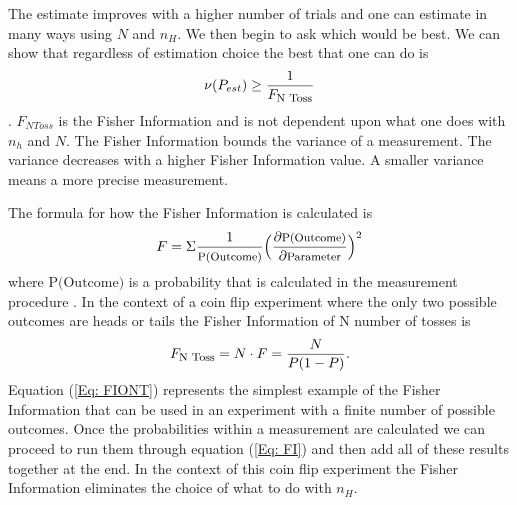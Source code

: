 \documentclass[twocolumn]{article}
\begin{document}
The estimate improves with a higher number of trials and one can estimate in many ways using $N$ and $n_H$. We then begin to ask which would be best. We can show that regardless of estimation choice the best that one can do is
\begin{equation} \label{Eq: VOPE}
\nu(P_{est})\geq\frac{1}{F_{\text{\footnotesize{N Toss}}}}
\end{equation}
\cite{D. Collins}. $F_{N Toss}$ is the Fisher Information and is not dependent upon what one does with $n_h$ and $N$. The Fisher Information bounds the variance of a measurement.  The variance decreases with a higher Fisher Information value. A smaller variance means a more precise measurement.

The formula for how the Fisher Information is calculated is 
\begin{equation} \label{Eq: FI}
F=\Sigma\frac{1}{\text{\footnotesize{P(Outcome)}}}\Big(\frac{\partial \text{\footnotesize{P(Outcome)}}}{\partial\text{\footnotesize{Parameter}}}\Big)^2
\end{equation}
where $\text{P(Outcome)}$ is a probability that is calculated in the measurement procedure \cite{Paris}. In the context of a coin flip experiment where the only two possible outcomes are heads or tails the Fisher Information of N number of tosses is
\begin{equation} \label{Eq: FIONT}
F_{\text{\footnotesize{N Toss}}}=N\cdot F=\frac{N}{P(1-P)}.
\end{equation}
Equation (\ref{Eq: FIONT}) represents the simplest example of the Fisher Information that can be used in an experiment with a finite number of possible outcomes. Once the probabilities within a measurement are calculated we can proceed to run them through equation (\ref{Eq: FI}) and then add all of these results together at the end. In the context of this coin flip experiment the Fisher Information eliminates the choice of what to do with $n_H$.
\end{document}
